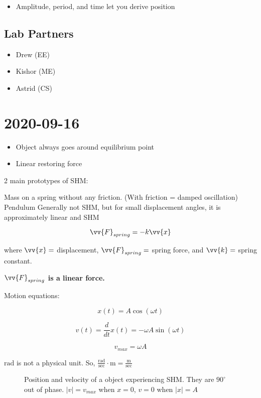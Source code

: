 \begin{itemize}
    \item Amplitude, period, and time let you derive position
\end{itemize}

\subsection{Lab Partners}

\begin{itemize}
    \item Drew (EE)
    \item Kishor (ME)
    \item Astrid (CS)
\end{itemize}

\section{2020-09-16}

\begin{itemize}
    \item Object always goes around equilibrium point
    \item Linear restoring force
\end{itemize}

2 main prototypes of SHM:
\begin{outline}
    \1 Mass on a spring without any friction. (With friction = damped oscillation)
    \1 Pendulum
        \2 Generally not SHM, but for small displacement angles, it is approximately linear and SHM
\end{outline}

$$\vv{F}_{spring} = -k\vv{x}$$

where $\vv{x} = $ displacement, $\vv{F}_{spring} = $ spring force, and $\vv{k} = $ spring constant.

\textbf{$\vv{F}_{spring}$ is a linear force.}

Motion equations:

$$x(t) = A\cos(\omega t)$$

$$v(t) = \frac{d}{dt}x(t) = -\omega A \sin(\omega t)$$

$$v_{max} = \omega A$$

$\si{\radian}$ is not a physical unit. So, $\frac{\si{\radian}}{\si{\sec}} \cdot \si{\metre} = \frac{\si{\metre}}{\si{\sec}}$

\begin{figure}
    \centering
    
    \caption{Position and velocity of a object experiencing SHM. They are $90^\circ$ out of phase. $|v| = v_{max}$ when $x = 0$, $v = 0$ when $|x| = A$}
\end{figure}

